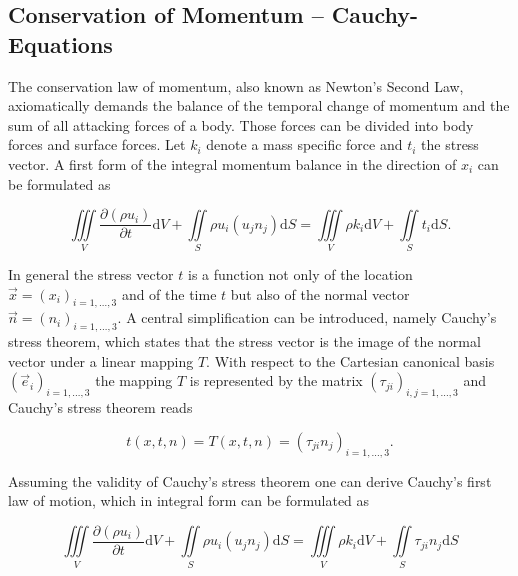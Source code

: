     \subsection{Conservation of Momentum -- Cauchy-Equations}

    The conservation law of momentum, also known as Newton's Second Law, axiomatically demands the balance of the temporal change of momentum and the sum of all attacking forces of a body. Those forces can be divided into body forces and surface forces. Let \(k_i\) denote a mass specific force and \(t_i\) the stress vector. A first form of the integral momentum balance in the direction of \(x_i\) can be formulated as

    \begin{displaymath}
      \iiint\limits_V \frac{\partial \left(\rho u_i \right)}{\partial t} \mathrm{d}V + \iint\limits_S \rho u_i \left( u_j n_j \right) \mathrm{d}S = \iiint\limits_V \rho k_i \mathrm{d}V + \iint\limits_S t_i \mathrm{d}S.
    \end{displaymath}

    In general the stress vector \(t\) is a function not only of the location \(\vec{x} = \left( x_i \right)_{i = 1,\dots,3}\) and of the time \(t\) but also of the normal vector \(\vec{n} = \left( n_i \right)_{i = 1,\dots,3} \). A central simplification can be introduced, namely Cauchy's stress theorem, which states that the stress vector is the image of the normal vector under a linear mapping \(T\). With respect to the Cartesian canonical basis \(\left(\vec{e}_i \right)_{i = 1, \dots, 3}\) the mapping \(T\) is represented by the matrix \( \left(\tau_{ji}\right)_{i,j = 1,\dots,3}\) and Cauchy's stress theorem reads

    \begin{displaymath}
      t\left(x,t,n\right) = T(x,t,n) = \left(\tau_{ji} n_j\right)_{i = 1, \dots, 3}.
    \end{displaymath}

    Assuming the validity of Cauchy's stress theorem one can derive Cauchy's first law of motion, which in integral form can be formulated as

    \begin{equation}
      \iiint\limits_V \frac{\partial \left(\rho u_i \right)}{\partial t} \mathrm{d}V + \iint\limits_S \rho u_i \left( u_j n_j \right) \mathrm{d}S = \iiint\limits_V \rho k_i \mathrm{d}V + \iint\limits_S \tau_{ji}n_j \mathrm{d}S
    \end{equation}

